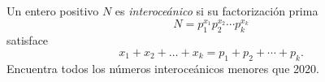 Un entero positivo $N$ es \textit{interoceánico} si su factorización prima
\[ N=p_1^{x_1}p_2^{x_2}\cdots p_k^{x_k} \]
satisface
\[ x_1+x_2+\dots +x_k=p_1+p_2+\cdots +p_k. \]
Encuentra todos los números interoceánicos menores que 2020.
